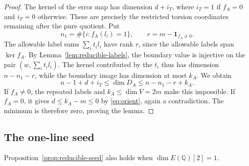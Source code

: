 \begin{proof}
The kernel of the error map has dimension \(d+i_T\), where
\(i_T=1\) if \(f_A=0\) and \(i_T=0\) otherwise.  These are precisely the
restricted torsion coordinates remaining after the pure quotient.  Put
\[
 n_1=\#\{i:f_A(l_i)=1\},\qquad r=m-\mathbf1_{f_A\ne0}.
\]
The allowable label sums \(\sum_i t_i l_i\) have rank \(r\), since the
allowable labels span \(\ker f_A\).  By
Lemma~\ref{lem:reducible-labels}, the boundary value is injective on the
pair \((w,\sum_i t_i l_i)\).  The kernel contributed by the \(t_i\) thus
has dimension \(n-n_1-r\), while the boundary image has dimension at most
\(k_A\).  We obtain
\[
 n-1+d+i_T\le\dim D_A\le n-n_1-r+k_A.
\]
If \(f_A\ne0\), the repeated labels and \(k_A\le\dim V=2m\) make this
impossible.  If \(f_A=0\), it gives
\(d\le k_A-m\le0\) by \eqref{eq:orient}, again a contradiction.
The minimum is therefore zero, proving the lemma.
\end{proof}

\subsection{The one-line seed}

\begin{lemma}\label{lem:reducible-one-line}
Proposition~\ref{prop:reducible-seed} also holds when
\(\dim E(\mathbb Q)[2]=1\).
\end{lemma}

